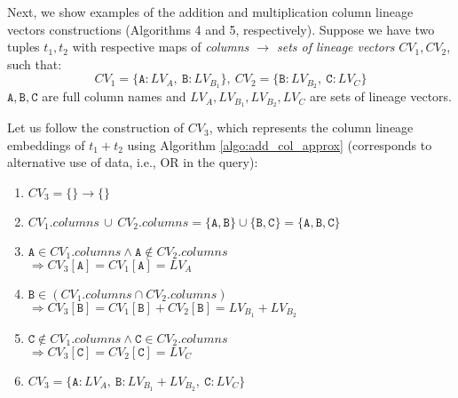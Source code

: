 \begin{runexample}
    Next, we show examples of the addition and multiplication column lineage vectors constructions (Algorithms 4 and 5, respectively).
    Suppose we have two tuples $t_1, t_2$ with respective maps of \textit{columns $\rightarrow$ sets of lineage vectors} $CV_1, CV_2$, such that:
    \begin{equation*}
        CV_1 = \{\texttt{A}\!: LV_A,\: \texttt{B}\!: LV_{B_1}\},\: CV_2 = \{\texttt{B}\!: LV_{B_2},\: \texttt{C}\!: LV_C\}
    \end{equation*}
    $\texttt{A}, \texttt{B}, \texttt{C}$ are full column names and $LV_A, LV_{B_1}, LV_{B_2}, LV_C$ are sets of lineage vectors.
\end{runexample}
\begin{example-withrun}\label{example:algo_add_col}
    Let us follow the construction of $CV_3$, which represents the column lineage embeddings of $t_1 + t_2$ using Algorithm \ref{algo:add_col_approx} (corresponds to alternative use of data, i.e., OR in the query):
    \begin{enumerate}
        \item $CV_3 = \{\} \rightarrow \{\}$
        \item $CV_1.columns \,\cup\, CV_2.columns = \{\texttt{A}, \texttt{B}\} \cup \{\texttt{B}, \texttt{C}\} = \{\texttt{A}, \texttt{B}, \texttt{C}\}$
        \item $\texttt{A} \in CV_1.columns \wedge \texttt{A} \notin CV_2.columns $\\ $\Rightarrow CV_3[\texttt{A}] = CV_1[\texttt{A}] = LV_A$
        \item $\texttt{B} \in (CV_1.columns \cap CV_2.columns) $\\ $\Rightarrow CV_3[\texttt{B}] = CV_1[\texttt{B}] + CV_2[\texttt{B}] = LV_{B_1} + LV_{B_2}$
        \item $\texttt{C} \notin CV_1.columns \wedge \texttt{C} \in CV_2.columns $\\ $\Rightarrow CV_3[\texttt{C}] = CV_2[\texttt{C}] = LV_C$
        \item $CV_3 = \{\texttt{A}\!: LV_A,\: \texttt{B}\!: LV_{B_1} + LV_{B_2},\: \texttt{C}\!: LV_C\}$
    \end{enumerate}
\end{example-withrun}
